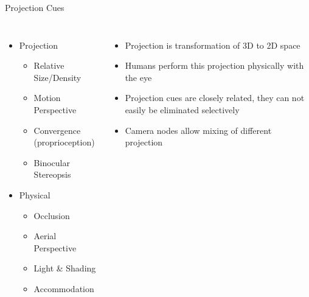 \documentclass[12pt,ucs,hyperref={pdftext}]{beamer}
\begin{document}
\begin{frame}{Projection Cues}
\begin{columns}

\column{5.5cm}
\begin{itemize}
\item Projection
\begin{itemize}
\item Relative Size/Density
\item Motion Perspective
\item Convergence (proprioception)
\item Binocular Stereopsis
\end{itemize}

\item<uncover@0> Physical
\begin{itemize}
\item Occlusion
\item Aerial Perspective
\item Light \& Shading
\item Accommodation
\end{itemize}

\end{itemize}

\column{5.5cm}
\begin{itemize}%
\item Projection is transformation of 3D to 2D space
\item Humans perform this projection physically with the eye
\item Projection cues are closely related, they can not easily be eliminated selectively
\item Camera nodes allow mixing of different projection
\end{itemize}

\end{columns}
\end{frame}
\end{document}
